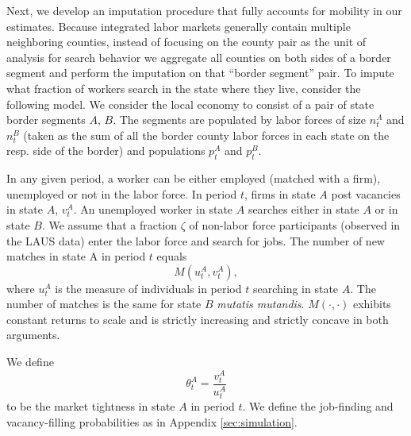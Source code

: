 \documentclass[12pt]{article}
\newcommand{\1}{\mathbf{1}}
\newcommand{\vat}{v^A_t}
\newcommand{\tat}{\theta^A_t}
\newcommand{\uat}{u^A_t}
\newcommand{\pat}{p^A_t}
\newcommand{\pbt}{p^B_t}
\begin{document}
\begin{appendix}
\begin{table}[t]
\centering
\small
	\captionsetup{justification=centering}
   \caption{Unemployment Benefit Extensions and \\ Mobility Across State Borders. LODES data.} \label{tab:Mobility_LODES}

\vspace{-0.3cm}
\end{table}

Next, we develop an imputation procedure that fully accounts for mobility in our estimates. Because integrated labor markets generally contain multiple neighboring counties, instead of focusing on the county pair as the unit of analysis for search behavior we aggregate all counties on both sides of a border segment and perform the imputation on that ``border segment'' pair. To impute what fraction of workers search in the state where they live, consider the following model. We consider the local economy to consist of a pair of state border segments $A$, $B$.  The segments are populated by labor forces of size $n_t^A$ and $n_t^B$ (taken as the sum of all the border county labor forces in each state on the resp. side of the border) and populations $\pat$ and $\pbt$.

In any given period, a worker can be either employed (matched with a firm), unemployed or not in the labor force. In period $t$, firms in state $A$ post vacancies in state $A$, $\vat$.  An unemployed worker in state $A$ searches either in state $A$ or in state $B$.  We assume that a fraction $\zeta$ of non-labor force participants (observed in the LAUS data) enter the labor force and search for jobs.  The number of new matches in state A in period $t$ equals
\begin{equation*}
M\left(\uat, \vat\right),
\end{equation*}
where $\uat$ is the measure of individuals in period $t$ searching in state $A$. The number of matches is the same for state $B$ \textit{mutatis mutandis}. $M(\cdot,\cdot)$
exhibits constant returns to scale and is strictly increasing and  strictly concave in both arguments.

We define
\begin{equation*}
\tat = \frac{\vat}{\uat}
\end{equation*}
to be the market tightness in state $A$ in period $t$.  We define the job-finding and vacancy-filling probabilities as in Appendix \ref{sec:simulation}.







\end{appendix}
\end{document}
